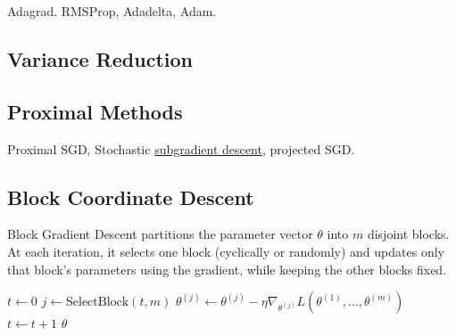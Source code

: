 	Adagrad. RMSProp, Adadelta, Adam. 

\subsection{Variance Reduction} 

\subsection{Proximal Methods}

	Proximal SGD, Stochastic \hyperref[def:subgradient_descent]{subgradient descent}, projected SGD. 

\subsection{Block Coordinate Descent} 

  \begin{algo}
    Block Gradient Descent partitions the parameter vector $\theta$ into $m$ disjoint blocks. At each iteration, it selects one block (cyclically or randomly) and updates only that block's parameters using the gradient, while keeping the other blocks fixed. 
    \begin{algorithm}[H]
    \label{alg:block_gd}
    \begin{algorithmic}[1]  %

        \State $t \gets 0$
          \State $j \gets \text{SelectBlock}(t, m)$ 
          \State $\theta^{(j)} \gets \theta^{(j)} - \eta \nabla_{\theta^{(j)}} L(\theta^{(1)}, \dots, \theta^{(m)})$
          \State $t \gets t + 1$
        \EndWhile
        \State \Return $\theta$
      \EndProcedure
    \end{algorithmic}
    \end{algorithm}
  \end{algo}

